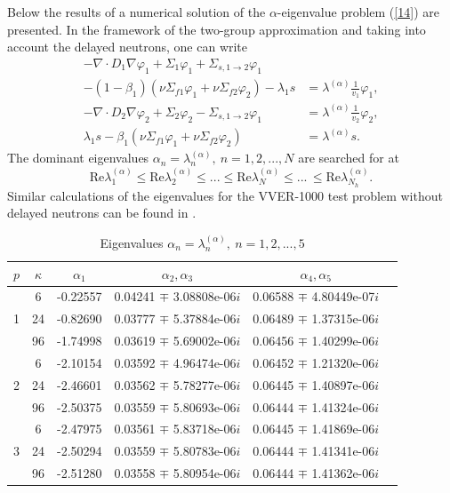 \documentclass[authoryear]{elsarticle}
\begin{document}
Below the results of a numerical solution of the $\alpha$-eigenvalue problem (\ref{14}) are presented. 
In the framework of the two-group approximation and taking into account the delayed neutrons, one can write 
\begin{equation}\label{23}
\begin{split}
 - \nabla \cdot D_1 \nabla \varphi_1  + \Sigma_1 \varphi_1 + \Sigma_{s,1\rightarrow 2} \varphi_1  & \\
 - (1 - \beta_1)(\nu \Sigma_{f1} \varphi_1 + \nu \Sigma_{f2} \varphi_2) - \lambda_1 s & = \lambda^{(\alpha)} \frac{1}{v_1}   \varphi_1, \\
 - \nabla \cdot D_2 \nabla \varphi_2  + \Sigma_2 \varphi_2  - \Sigma_{s,1\rightarrow 2} \varphi_1  
 & = \lambda^{(\alpha)} \frac{1}{v_2}   \varphi_2,\\
 \lambda_1 s - \beta_1(\nu \Sigma_{f1} \varphi_1 + \nu \Sigma_{f2} \varphi_2) & = \lambda^{(\alpha)} s. 
\end{split}
\end{equation} 
The dominant eigenvalues $\alpha_n = \lambda_n^{(\alpha)}, \ n = 1,2, ..., N$ are searched for at
\[
 \mathrm{Re}  \lambda_1^{(\alpha)} \leq  \mathrm{Re}  \lambda_2^{(\alpha)} \leq ... 
 \leq \mathrm{Re}  \lambda_N^{(\alpha)} \leq ...\, \leq \mathrm{Re}  \lambda_{N_h}^{(\alpha)}.
\]
Similar calculations of the eigenvalues for the VVER-1000 test problem without delayed neutrons can be found in \cite{avvakumov2017spectral}. 

\begin{table}[h]
\caption{Eigenvalues $\alpha_n = \lambda_n^{(\alpha )}, \ n = 1,2, ..., 5$}
\label{t-2}
\begin{center}
\begin{tabular}{cccccc}
\hline
$p$ & $\kappa$ & $\alpha_1$ &  $\alpha_2, \alpha_3$ &  $\alpha_4, \alpha_5$ \\ 
\hline
& 6 & -0.22557  & 0.04241 $\mp$ 3.08808e-06$i$  & 0.06588 $\mp$ 4.80449e-07$i$  \\
1 & 24 & -0.82690  & 0.03777 $\mp$ 5.37884e-06$i$  & 0.06489 $\mp$ 1.37315e-06$i$ \\
& 96 & -1.74998  & 0.03619 $\mp$ 5.69002e-06$i$  & 0.06456 $\mp$ 1.40299e-06$i$ \\
\hline
& 6 & -2.10154  & 0.03592 $\mp$ 4.96474e-06$i$  & 0.06452 $\mp$ 1.21320e-06$i$ \\
2 & 24 & -2.46601  & 0.03562 $\mp$ 5.78277e-06$i$  & 0.06445 $\mp$ 1.40897e-06$i$ \\
& 96 & -2.50375  & 0.03559 $\mp$ 5.80693e-06$i$  & 0.06444 $\mp$ 1.41324e-06$i$ \\
\hline
& 6 & -2.47975  & 0.03561 $\mp$ 5.83718e-06$i$  & 0.06445 $\mp$ 1.41869e-06$i$ \\
3 & 24 & -2.50294  & 0.03559 $\mp$ 5.80783e-06$i$  & 0.06444 $\mp$ 1.41341e-06$i$ \\
& 96 & -2.51280  & 0.03558 $\mp$ 5.80954e-06$i$  & 0.06444 $\mp$ 1.41362e-06$i$ \\
\hline
\end{tabular}
\end{center}
\end{table}
\end{document}
